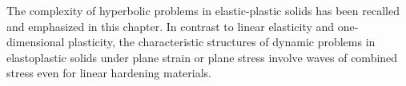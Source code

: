 

The complexity of hyperbolic problems in elastic-plastic solids has been recalled and emphasized in this chapter.
In contrast to linear elasticity and one-dimensional plasticity, the characteristic structures of dynamic problems in elastoplastic solids under plane strain or plane stress involve waves of combined stress even for linear hardening materials.












